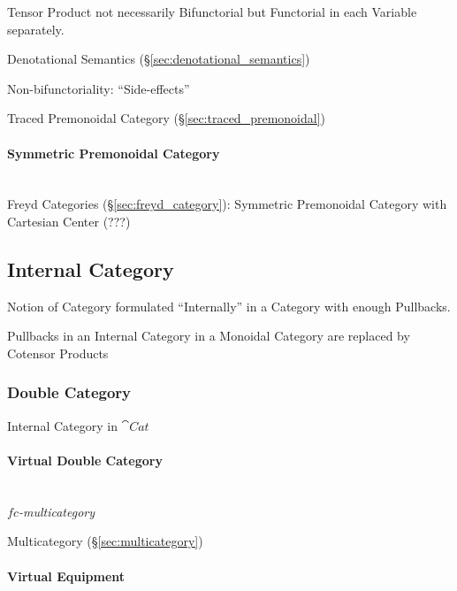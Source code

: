 Tensor Product not necessarily Bifunctorial but Functorial in each
Variable separately.

Denotational Semantics (\S\ref{sec:denotational_semantics})

Non-bifunctoriality: ``Side-effects'' \cite{jacobs-heunen-hasuo09}

Traced Premonoidal Category (\S\ref{sec:traced_premonoidal})



\paragraph{Symmetric Premonoidal Category}
\label{sec:symmetric_premonoidal_category}
\hfill \\

Freyd Categories (\S\ref{sec:freyd_category}): Symmetric Premonoidal
Category with Cartesian Center (???)



\subsection{Internal Category}\label{sec:internal_category}

Notion of Category formulated ``Internally'' in a Category with enough
Pullbacks.

Pullbacks in an Internal Category in a Monoidal Category are replaced
by Cotensor Products



\subsubsection{Double Category}\label{sec:double_category}

Internal Category in $\cat{Cat}$



\paragraph{Virtual Double Category}\label{sec:virtual_double_category}
\hfill \\

\emph{$fc$-multicategory}

Multicategory (\S\ref{sec:multicategory})



\paragraph{Virtual Equipment}\label{sec:virtual_equipment}
\hfill \\

